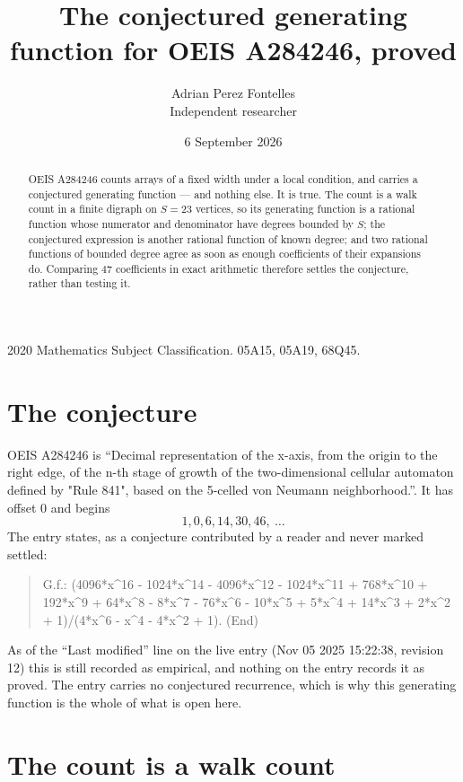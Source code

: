 \documentclass[11pt,a4paper]{article}
\title{The conjectured generating function for OEIS A284246, proved}
\author{Adrian Perez Fontelles\\ \small Independent researcher}
\date{6 September 2026}
\theoremstyle{plain}
\theoremstyle{definition}
\begin{document}
\maketitle

\begin{abstract}
OEIS A284246 counts arrays of a fixed width under a local condition, and carries a conjectured
generating function --- and nothing else. It is true. The count is a walk count in a finite
digraph on $S=23$ vertices, so its generating function is a rational function whose numerator
and denominator have degrees bounded by $S$; the conjectured expression is another rational
function of known degree; and two rational functions of bounded degree agree as soon as enough
coefficients of their expansions do. Comparing $47$ coefficients in exact arithmetic
therefore settles the conjecture, rather than testing it.
\end{abstract}

\noindent\small 2020 Mathematics Subject Classification. 05A15, 05A19, 68Q45.\normalsize

\section{The conjecture}

OEIS A284246 is ``Decimal representation of the x-axis, from the origin to the right edge, of the n-th stage of growth of the two-dimensional cellular automaton defined by "Rule 841", based on the 5-celled von Neumann neighborhood.''. It has offset $0$ and begins
\[
1, 0, 6, 14, 30, 46,\ \dots
\]
The entry states, as a conjecture contributed by a reader and never marked settled:
\begin{quote}
G.f.: (4096*x\^{}16 - 1024*x\^{}14 - 4096*x\^{}12 - 1024*x\^{}11 + 768*x\^{}10 + 192*x\^{}9 + 64*x\^{}8 - 8*x\^{}7 - 76*x\^{}6 - 10*x\^{}5 + 5*x\^{}4 + 14*x\^{}3 + 2*x\^{}2 + 1)/(4*x\^{}6 - x\^{}4 - 4*x\^{}2 + 1). (End)
\end{quote}
As of the ``Last modified'' line on the live entry (Nov 05 2025 15:22:38, revision 12) this is still
recorded as empirical, and nothing on the entry records it as proved. The entry carries no
conjectured recurrence, which is why this generating function is the whole of what is open
here.

\section{The count is a walk count}
\end{document}
